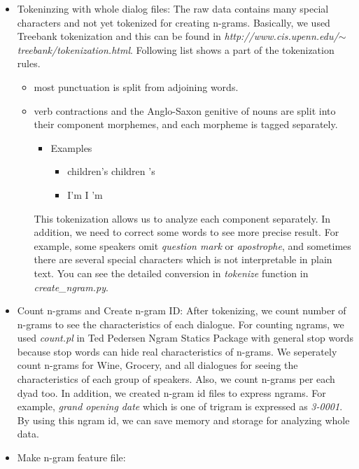 \documentclass[11pt]{article} %
\begin{document}
\begin{itemize}
\item Tokeninzing with whole dialog files: \newline
The raw data contains many special characters and not yet tokenized for creating n-grams. Basically, we used Treebank tokenization and this can be found in \textit{http://www.cis.upenn.edu/$\sim$treebank/tokenization.html}. Following list shows a part of the tokenization rules.
\begin{itemize}
\item most punctuation is split from adjoining words.
\item verb contractions and the Anglo-Saxon genitive of nouns are split into their component morphemes, and each morpheme is tagged separately.
\begin{itemize}
\item Examples
\begin{itemize}
\item children's \textrightarrow children 's
\item I'm \textrightarrow I 'm
\end{itemize}
\end{itemize}
This tokenization allows us to analyze each component separately.\newline
In addition, we need to correct some words to see more precise result. For example, some speakers omit \textit{question mark} or \textit{apostrophe}, and sometimes there are several special characters which is not interpretable in plain text. You can see the detailed conversion in \textit{tokenize} function in \textit{create\_ngram.py}.
\end{itemize}
\item Count n-grams and Create n-gram ID:\newline
After tokenizing, we count number of n-grams to see the characteristics of each dialogue. For counting ngrams, we used \textit{count.pl} in Ted Pedersen Ngram Statics Package with general stop words because stop words can hide real characteristics of n-grams. We seperately count n-grams for Wine, Grocery, and all dialogues for seeing the characteristics of each group of speakers. Also, we count n-grams per each dyad too. \newline
In addition, we created n-gram id files to express ngrams. For example, \textit{grand opening date} which is one of trigram is expressed as \textit{3-0001}. By using this ngram id, we can save memory and storage for analyzing whole data.
\item Make n-gram feature file:\newline

\end{itemize}
\end{document}
